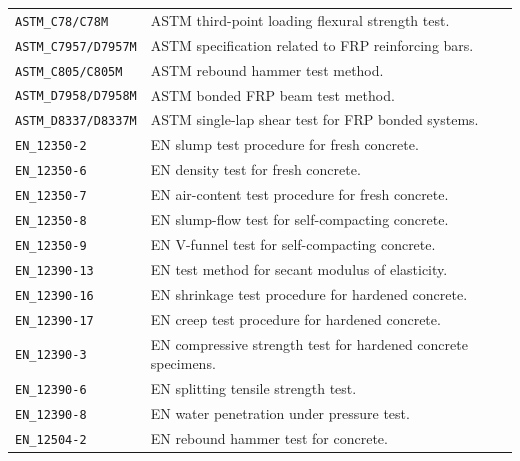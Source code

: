 \documentclass[11pt]{book}
\begin{document}
{\begin{longtable}{p{}p{}}
\texttt{ASTM\_C78/C78M} &
ASTM third-point loading flexural strength test. \\

\texttt{ASTM\_C7957/D7957M} &
ASTM specification related to FRP reinforcing bars. \\

\texttt{ASTM\_C805/C805M} &
ASTM rebound hammer test method. \\

\texttt{ASTM\_D7958/D7958M} &
ASTM bonded FRP beam test method. \\

\texttt{ASTM\_D8337/D8337M} &
ASTM single-lap shear test for FRP bonded systems. \\

\texttt{EN\_12350-2} &
EN slump test procedure for fresh concrete. \\

\texttt{EN\_12350-6} &
EN density test for fresh concrete. \\

\texttt{EN\_12350-7} &
EN air-content test procedure for fresh concrete. \\

\texttt{EN\_12350-8} &
EN slump-flow test for self-compacting concrete. \\

\texttt{EN\_12350-9} &
EN V-funnel test for self-compacting concrete. \\

\texttt{EN\_12390-13} &
EN test method for secant modulus of elasticity. \\

\texttt{EN\_12390-16} &
EN shrinkage test procedure for hardened concrete. \\

\texttt{EN\_12390-17} &
EN creep test procedure for hardened concrete. \\

\texttt{EN\_12390-3} &
EN compressive strength test for hardened concrete specimens. \\

\texttt{EN\_12390-6} &
EN splitting tensile strength test. \\

\texttt{EN\_12390-8} &
EN water penetration under pressure test. \\

\texttt{EN\_12504-2} &
EN rebound hammer test for concrete. \\


\end{longtable}}
\end{document}
